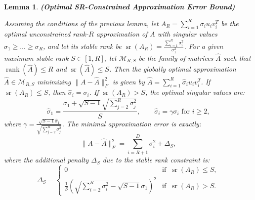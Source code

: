 \documentclass[a4paper,14pt]{extarticle}
\DeclareMathOperator{\rank}{rank}
\DeclareMathOperator{\sr}{sr}
\newtheorem{lemma}{Lemma}
\begin{document}
    \begin{lemma} \textbf{(Optimal SR-Constrained Approximation Error Bound)}

        Assuming the conditions of the previous lemma, let $A_R = \sum_{i=1}^R \sigma_i u_i v_i^T$ be the optimal unconstrained rank-$R$ approximation of $A$ with singular values $\sigma_1 \geqslant \dots \geqslant \sigma_R$, and let its stable rank be $\sr(A_R) = \frac{\sum_{i=1}^R \sigma_i^2}{\sigma_1^2}$. 
        For a given maximum stable rank $S \in [1, R]$, let $\mathcal{M}_{R, S}$ be the family of matrices $\hat{A}$ such that $\rank(\hat{A}) \leqslant R$ and $\sr(\hat{A}) \leqslant S$.
        Then the globally optimal approximation $\hat{A} \in \mathcal{M}_{R, S}$ minimizing $\|A - \hat{A}\|_F^2$ is given by $\hat{A} = \sum_{i=1}^R \hat{\sigma}_i u_i v_i^T$.
        If $\sr(A_R) \leqslant S$, then $\hat{\sigma}_i = \sigma_i$. If $\sr(A_R) > S$, the optimal singular values are:
        \[
        \hat{\sigma}_1 = \frac{\sigma_1 + \sqrt{S-1}\sqrt{\sum_{j=2}^R\sigma_j^2}}{S}, \quad \quad \hat{\sigma}_i = \gamma \sigma_i \text{ for } i \geqslant 2,
        \]
        where $\gamma = \frac{\sqrt{S-1}\hat{\sigma}_1}{\sqrt{\sum_{j=2}^R\sigma_j^2}}$. The minimal approximation error is exactly:
        \[
        \|A - \hat{A}\|_F^2 = \sum\limits_{i=R+1}^{D}\sigma_i^2 + \Delta_S,
        \]
        where the additional penalty $\Delta_S$ due to the stable rank constraint is:
        \[
        \Delta_S = \begin{cases} 0 & \text{if } ~ \sr(A_R) \leqslant S, \\ \frac{1}{S}\left(\sqrt{\sum\limits_{i=2}^R\sigma_i^2} - \sqrt{S - 1}\sigma_1\right)^2 & \text{if } ~ \sr(A_R) > S. \end{cases}
        \]
    \end{lemma}
\end{document}
